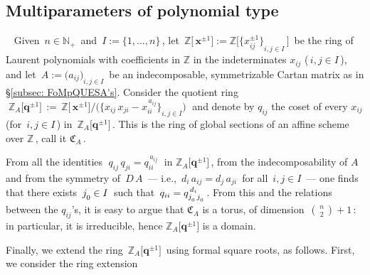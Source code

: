 \documentclass[12pt,reqno,twoside,a4paper]{amsart}
\numberwithin{equation}{section}
\theoremstyle{definition}
\newtheorem{free text}[lema]{}
\theoremstyle{remark}
\def \bq {\mathbf{q}}
\def \bx {\mathbf{x}}
\def \NN{\mathbb{N}}
\def \QQ{\mathbb{Q}}
\def \ZZ {\mathbb{Z}}
\def \Zabqpm {{\ZZ_A\big[\bq^{\pm 1}\big]}}
\def \Qabq {\QQ_A(\bq\hskip1,7pt)}
\theoremstyle{plain}
\begin{document}
\vskip15pt


\subsection{Multiparameters of polynomial type}
\label{subsec: multiparam-polynom}
%
 {\ }
%
 \vskip9pt
%
 Given  $ \, n \in \NN_+ \, $  and  $ \, I := \{1,\dots,n\} \, $,
 let  $ \, \ZZ\big[\,\bx^{\pm 1}\big] := \ZZ\big[ {\big\{ x_{ij}^{\pm 1} \big\}}_{i, j \in I} \,\big] \, $
 be the ring of Laurent polynomials with coefficients in  $ \ZZ $
 in the indeterminates  $ x_{ij} $  ($ \, i, j \in I \, $),
 and let  $ \, A := {\big( a_{ij} \big)}_{i, j \in I} \, $  be an indecomposable,
 symmetrizable Cartan matrix as in  \S \ref{subsec: FoMpQUESA's}.
 Consider the quotient ring
%
%
 $ \; \Zabqpm \, := \, \ZZ\big[\,\bx^{\pm 1}\big] \bigg/
 \Big( {\big\{ x_{ij} \, x_{ji} - x_{ii}^{\,a_{ij}} \big\}}_{i, j \in I} \Big) \; $
%
 and denote by  $ q_{ij} $  the coset of every  $ x_{ij} $
 (for  $ \, i, j \in I \, $)  in  $ \, \Zabqpm \, $.
 This is the ring of global sections of an affine scheme over
 $ \ZZ \, $,  call it  $ \mathfrak{C}_A \, $.
                                                         \par
   From all the identities  $ \; q_{ij} \, q_{ji} = q_{ii}^{\,a_{ij}} \; $
   in  $ \Zabqpm \, $,  from the indecomposability of  $ A $  and
   from the symmetry of  $ \, D\,A \, $   --- i.e.,
   $ \, d_i\,a_{ij} = d_j\,a_{ji} \, $  for all  $ \, i, j \in I \, $  ---
   one finds that there exists  $ \, j_{\raise-2pt\hbox{$ \scriptstyle 0 $}} \in I \, $
   such that  $ \, q_{ii} = q_{j_{\raise-2pt\hbox{$ \scriptscriptstyle 0 $}}
   \, j_{\raise-2pt\hbox{$ \scriptscriptstyle 0 $}}}^{\,d_i} \, $.
   From this and the relations between the  $ q_{ij} $'s, it is easy to
   argue that  $ \mathfrak{C}_A $  is a torus, of dimension
   $ \, {{\,n\,} \choose {\,2\,}} + 1 \, $:  in particular,
   it is irreducible, hence  $ \Zabqpm $  is a domain.
%
%
                                                                   \par
   Finally, we extend the ring  $ \, \Zabqpm \, $
   using formal square roots, as follows.  First, we consider the ring extension
\end{document}
